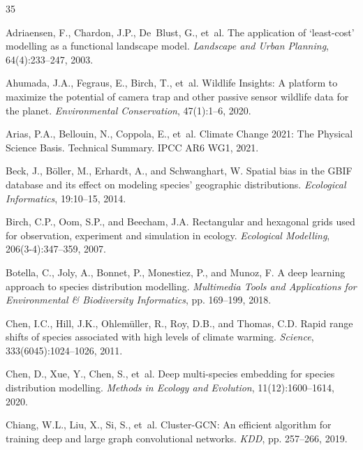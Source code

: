 \documentclass[11pt,a4paper]{article}
\begin{document}
\begin{thebibliography}{35}

Adriaensen, F., Chardon, J.P., De~Blust, G., et~al.
\newblock The application of `least-cost' modelling as a functional landscape
  model.
\newblock \emph{Landscape and Urban Planning}, 64(4):233--247, 2003.

Ahumada, J.A., Fegraus, E., Birch, T., et~al.
\newblock Wildlife Insights: A platform to maximize the potential of camera
  trap and other passive sensor wildlife data for the planet.
\newblock \emph{Environmental Conservation}, 47(1):1--6, 2020.

Arias, P.A., Bellouin, N., Coppola, E., et~al.
\newblock Climate Change 2021: The Physical Science Basis. Technical Summary.
\newblock IPCC AR6 WG1, 2021.

Beck, J., B{\"o}ller, M., Erhardt, A., and Schwanghart, W.
\newblock Spatial bias in the GBIF database and its effect on modeling species'
  geographic distributions.
\newblock \emph{Ecological Informatics}, 19:10--15, 2014.

Birch, C.P., Oom, S.P., and Beecham, J.A.
\newblock Rectangular and hexagonal grids used for observation, experiment and
  simulation in ecology.
\newblock \emph{Ecological Modelling}, 206(3-4):347--359, 2007.

Botella, C., Joly, A., Bonnet, P., Monestiez, P., and Munoz, F.
\newblock A deep learning approach to species distribution modelling.
\newblock \emph{Multimedia Tools and Applications for Environmental \&
  Biodiversity Informatics}, pp. 169--199, 2018.

Chen, I.C., Hill, J.K., Ohlem{\"u}ller, R., Roy, D.B., and Thomas, C.D.
\newblock Rapid range shifts of species associated with high levels of climate
  warming.
\newblock \emph{Science}, 333(6045):1024--1026, 2011.

Chen, D., Xue, Y., Chen, S., et~al.
\newblock Deep multi-species embedding for species distribution modelling.
\newblock \emph{Methods in Ecology and Evolution}, 11(12):1600--1614, 2020.

Chiang, W.L., Liu, X., Si, S., et~al.
\newblock Cluster-GCN: An efficient algorithm for training deep and large graph
  convolutional networks.
\newblock \emph{KDD}, pp. 257--266, 2019.


\end{thebibliography}
\end{document}
